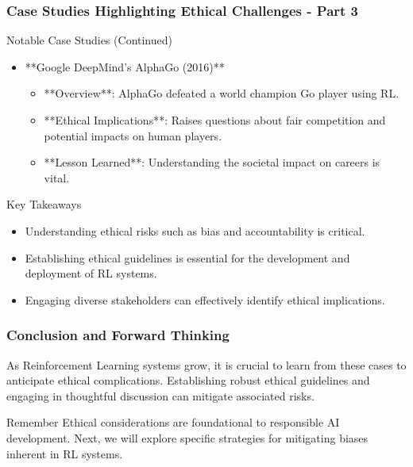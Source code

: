 \documentclass[aspectratio=169]{beamer}
\begin{document}
\begin{frame}[fragile]
    \frametitle{Case Studies Highlighting Ethical Challenges - Part 3}
    \begin{block}{Notable Case Studies (Continued)}
        \begin{itemize}
            \item **Google DeepMind{\textquoteright}s AlphaGo (2016)**
                \begin{itemize}
                    \item **Overview**: AlphaGo defeated a world champion Go player using RL.
                    \item **Ethical Implications**: Raises questions about fair competition and potential impacts on human players.
                    \item **Lesson Learned**: Understanding the societal impact on careers is vital.
                \end{itemize}
        \end{itemize}
        
        \begin{block}{Key Takeaways}
            \begin{itemize}
                \item Understanding ethical risks such as bias and accountability is critical.
                \item Establishing ethical guidelines is essential for the development and deployment of RL systems.
                \item Engaging diverse stakeholders can effectively identify ethical implications.
            \end{itemize}
        \end{block}
    \end{block}
\end{frame}

\begin{frame}[fragile]
    \frametitle{Conclusion and Forward Thinking}
    As Reinforcement Learning systems grow, it is crucial to learn from these cases to anticipate ethical complications. 
    Establishing robust ethical guidelines and engaging in thoughtful discussion can mitigate associated risks.

    \begin{block}{Remember}
        Ethical considerations are foundational to responsible AI development. 
        Next, we will explore specific strategies for mitigating biases inherent in RL systems.
    \end{block}
\end{frame}
\end{document}
